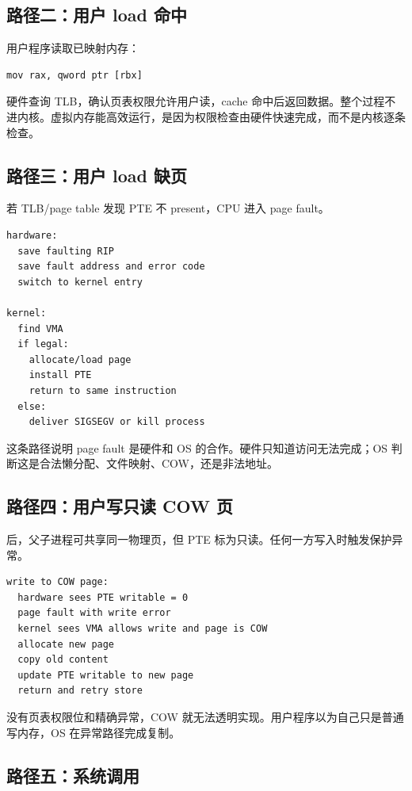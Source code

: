 \subsection{路径二：用户 load 命中}

用户程序读取已映射内存：

\begin{lstlisting}
mov rax, qword ptr [rbx]
\end{lstlisting}

硬件查询 TLB，确认页表权限允许用户读，cache 命中后返回数据。整个过程不进内核。虚拟内存能高效运行，是因为权限检查由硬件快速完成，而不是内核逐条检查。

\subsection{路径三：用户 load 缺页}

若 TLB/page table 发现 PTE 不 present，CPU 进入 page fault。

\begin{lstlisting}
hardware:
  save faulting RIP
  save fault address and error code
  switch to kernel entry

kernel:
  find VMA
  if legal:
    allocate/load page
    install PTE
    return to same instruction
  else:
    deliver SIGSEGV or kill process
\end{lstlisting}

这条路径说明 page fault 是硬件和 OS 的合作。硬件只知道访问无法完成；OS 判断这是合法懒分配、文件映射、COW，还是非法地址。

\subsection{路径四：用户写只读 COW 页}

 后，父子进程可共享同一物理页，但 PTE 标为只读。任何一方写入时触发保护异常。

\begin{lstlisting}
write to COW page:
  hardware sees PTE writable = 0
  page fault with write error
  kernel sees VMA allows write and page is COW
  allocate new page
  copy old content
  update PTE writable to new page
  return and retry store
\end{lstlisting}

没有页表权限位和精确异常，COW 就无法透明实现。用户程序以为自己只是普通写内存，OS 在异常路径完成复制。

\subsection{路径五：系统调用}

